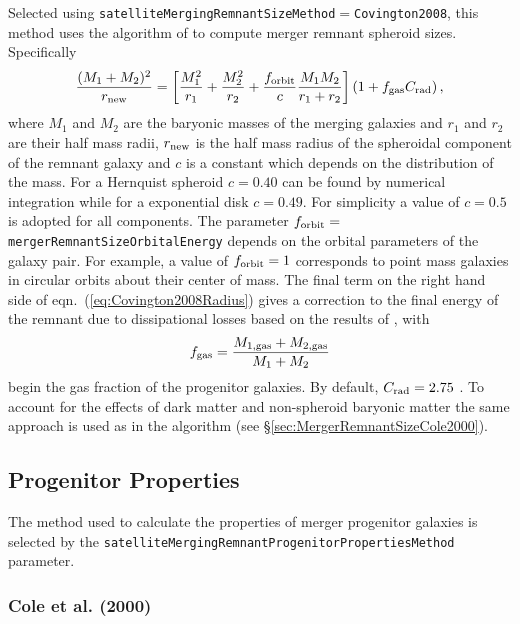Selected using {\tt satelliteMergingRemnantSizeMethod}$=${\tt Covington2008}, this method uses the algorithm of \cite{covington_predicting_2008} to compute merger remnant spheroid sizes. Specifically
\begin{equation}
\frac{(M_1+M_2)^2}{ r_{\rm new}} =
\left[ \frac{M_1^2}{r_1} + \frac{M_2^2}{r_2} + \frac{ f_{\rm orbit}}{c}
\frac{M_1 M_2}{r_1+r_2}\right] \left( 1 + f_{\rm gas} C_{\rm rad} \right),
\label{eq:Covington2008Radius}
\end{equation}
where $M_1$ and $M_2$ are the baryonic masses of the merging galaxies and $r_1$
and $r_2$ are their half mass radii, $r_{\rm new}$ is the half mass radius of the spheroidal \gls{component} of the remnant galaxy and $c$ is a constant which depends on the distribution of the mass. For a Hernquist spheroid $c=0.40$ can be found by numerical integration while for a exponential disk $c=0.49$. For simplicity a value of $c=0.5$ is adopted for all components. The parameter $f_{\rm orbit}=${\tt mergerRemnantSizeOrbitalEnergy} depends on the orbital parameters of the galaxy pair. For example, a value of $f_{\rm orbit} = 1$ corresponds to point mass galaxies in circular orbits about their center of mass. The final term on the right hand side of eqn.~(\ref{eq:Covington2008Radius}) gives a correction to the final energy of the remnant due to dissipational losses based on the results of \cite{covington_effects_2011}, with
\begin{equation}
 f_{\rm gas} = {M_{\rm 1,gas}+M_{\rm 2,gas} \over M_1+M_2}
\end{equation}
begin the gas fraction of the progenitor galaxies. By default, $C_{\rm rad}=2.75$ \citep{covington_effects_2011}. To account for the effects of dark matter and non-spheroid baryonic matter the same approach is used as in the \cite{cole_hierarchical_2000} algorithm (see \S\ref{sec:MergerRemnantSizeCole2000}). 

\subsection{Progenitor Properties}

The method used to calculate the properties of merger progenitor galaxies is selected by the {\tt satelliteMergingRemnantProgenitorPropertiesMethod} parameter.

\subsubsection{Cole et al. (2000)}

